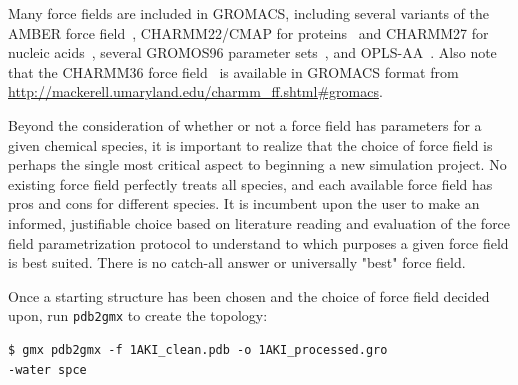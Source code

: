 \documentclass[9pt,tutorial]{livecoms}
\begin{document}
Many force fields are included in GROMACS, including several variants of the AMBER force field~\cite{Cornell1994,Kollman1996,Wang2000,Garcia2002,Duan2003,Hornak2006,LindorffLarsen2010}, CHARMM22/CMAP for proteins~\cite{MacKerell1998,MacKerell2004} and CHARMM27 for nucleic acids~\cite{Foloppe2000,MacKerell2000}, several GROMOS96 parameter sets~\cite{Daura1998,Schuler2001,Oostenbrink2004,Schmid2011}, and OPLS-AA~\cite{Kaminski2001}. Also note that the CHARMM36 force field~\cite{Best2012,Hart2012,Denning2011,Klauda2010,Huang2016} is available in GROMACS format from \url{http://mackerell.umaryland.edu/charmm_ff.shtml#gromacs}.

Beyond the consideration of whether or not a force field has parameters for a given chemical species, it is important to realize that the choice of force field is perhaps the single most critical aspect to beginning a new simulation project. No existing force field perfectly treats all species, and each available force field has pros and cons for different species. It is incumbent upon the user to make an informed, justifiable choice based on literature reading and evaluation of the force field parametrization protocol to understand to which purposes a given force field is best suited. There is no catch-all answer or universally "best" force field.

Once a starting structure has been chosen and the choice of force field decided upon, run \texttt{pdb2gmx} to create the topology:

\begin{verbatim}
$ gmx pdb2gmx -f 1AKI_clean.pdb -o 1AKI_processed.gro 
-water spce
\end{verbatim}
\end{document}

